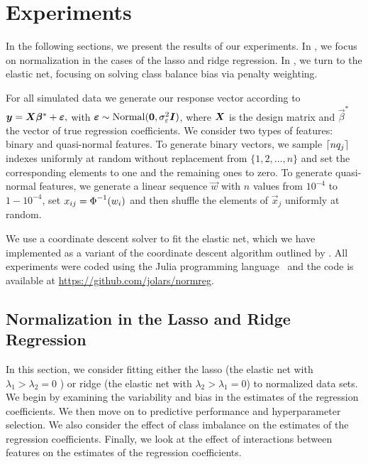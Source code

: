\section{Experiments}\label{sec:experiments}

In the following sections, we present the results of our experiments. In
, we focus on normalization in the cases of the lasso and
ridge regression. In , we turn to the elastic net,
focusing on solving class balance bias via penalty weighting.

For all simulated data we generate our response vector according to \(\boldsymbol{y} =
\boldsymbol{X}\boldsymbol{\beta}^* + \boldsymbol{\varepsilon},\) with \(\boldsymbol{\varepsilon} \sim \operatorname{Normal}(\boldsymbol{0},
\sigma_\varepsilon^2 \boldsymbol{I})\), where \(\boldsymbol{X}\) is the design matrix and
\(\vec{\beta}^*\) the vector of true regression coefficients. We consider two types of
features: binary and quasi-normal features. To generate binary vectors, we sample
\(\lceil nq_j \rceil\) indexes uniformly at random without replacement from \(\{1,2,\dots,n\}\)
and set the corresponding elements to one and the remaining ones to zero. To generate
quasi-normal features, we generate a linear sequence \(\vec{w}\) with \(n\) values from
\(10^{-4}\) to \(1 - 10^{-4}\), set \(x_{ij} = \operatorname{\Phi}^{-1}(w_i)\) and then shuffle the
elements of \(\vec{x}_j\) uniformly at random.

We use a coordinate descent solver to fit the elastic net, which we have implemented as a
variant of the coordinate descent algorithm outlined by \citet{friedman2010}. All
experiments were coded using the Julia programming language~\citep{bezanson2017} and the
code is available at \url{https://github.com/jolars/normreg}.

\subsection{Normalization in the Lasso and Ridge Regression}\label{sec:experiments-lassoridge}

In this section, we consider fitting either the lasso (the elastic net with \(\lambda_1 >
\lambda_2 = 0\) ) or ridge (the elastic net with \(\lambda_2 > \lambda_1 = 0\)) to
normalized data sets. We begin by examining the variability and bias in the estimates of
the regression coefficients. We then move on to predictive performance and hyperparameter
selection. We also consider the effect of class imbalance on the estimates of the
regression coefficients. Finally, we look at the effect of interactions between features on
the estimates of the regression coefficients.

